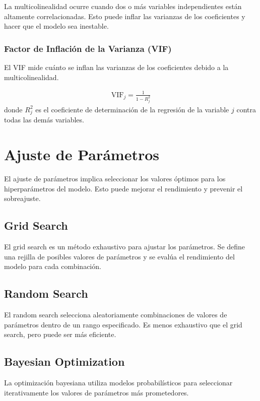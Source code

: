 \documentclass[a4paper]{report} %
\begin{document}
La multicolinealidad ocurre cuando dos o m\'as variables independientes est\'an altamente correlacionadas. Esto puede inflar las varianzas de los coeficientes y hacer que el modelo sea inestable.

\subsubsection{Factor de Inflaci\'on de la Varianza (VIF)}

El VIF mide cu\'anto se inflan las varianzas de los coeficientes debido a la multicolinealidad.

\begin{eqnarray*}
\text{VIF}_j = \frac{1}{1 - R_j^2}
\end{eqnarray*}
donde $R_j^2$ es el coeficiente de determinaci\'on de la regresi\'on de la variable $j$ contra todas las dem\'as variables.

\section{Ajuste de Par\'ametros}

El ajuste de par\'ametros implica seleccionar los valores \'optimos para los hiperpar\'ametros del modelo. Esto puede mejorar el rendimiento y prevenir el sobreajuste.

\subsection{Grid Search}

El grid search es un m\'etodo exhaustivo para ajustar los par\'ametros. Se define una rejilla de posibles valores de par\'ametros y se eval\'ua el rendimiento del modelo para cada combinaci\'on.

\subsection{Random Search}

El random search selecciona aleatoriamente combinaciones de valores de par\'ametros dentro de un rango especificado. Es menos exhaustivo que el grid search, pero puede ser m\'as eficiente.

\subsection{Bayesian Optimization}

La optimizaci\'on bayesiana utiliza modelos probabil\'isticos para seleccionar iterativamente los valores de par\'ametros m\'as prometedores.
\end{document}

